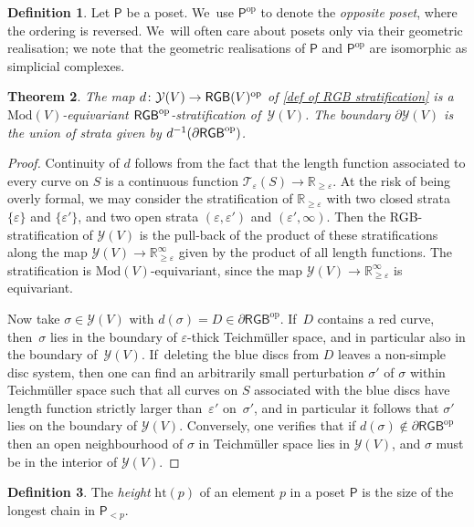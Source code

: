 \documentclass[JEP,XML,SOM,Unicode,NoFloatCountersInSection,published]{cedram}
\theoremstyle{plain}
\newtheorem{thm}{Theorem}[section]
\theoremstyle{definition}
\newtheorem{defn}[thm]{Definition}
\let\eps\varepsilon
\newcommand{\R}{\mathbb R}
\newcommand{\T}{\mathcal T}
\newcommand{\Y}{\mathcal Y}
\newcommand{\RGB}{{\mathsf{RGB}}}
\newcommand{\dRGB}{\partial\mathsf{RGB}}
\newcommand{\Po}{\mathsf{P}}
\newcommand{\hmod}{\mathrm{Mod}}
\newcommand{\op}{{\mathrm{op}}}
\newcommand{\Ht}{{\mathrm{ht}}}
\begin{document}
\begin{defn}Let $\Po$ be a poset. We~use $\Po^\op$ to denote the \emph{opposite poset}, where the ordering is reversed. We~will often care about posets only via their geometric realisation; we note that the geometric realisations of $\Po$ and $\Po^\op$ are isomorphic as simplicial complexes.
\end{defn}

\begin{thm}\label{thm:combinatorial model}
The map $d \colon \Y(V) \to \RGB(V)^\textnormal{op}$ of \cref{def of RGB stratification} is a $\hmod(V)$-equivariant $\RGB^\textnormal{op}$-stratification of $\,\Y(V)$. The boundary $\partial \Y(V)$ is the union of strata given by $d^{-1}(\dRGB^\textnormal{op})$.
\end{thm}

\begin{proof}Continuity of $d$ follows from the fact that the length function associated to every curve on $S$ is a continuous function $\T_\eps(S)\to \R_{\geq \eps}$. At the risk of being overly formal, we may consider the stratification of $\R_{\geq \eps}$ with two closed strata $\{\eps\}$ and $\{\eps'\}$, and two open strata $(\eps,\eps')$ and $(\eps',\infty)$. Then the RGB-stratification of $\Y(V)$ is the pull-back of the product of these stratifications along the map $\Y(V) \to \R_{\geq \eps}^\infty$ given by the product of all length functions. The stratification is $\hmod(V)$-equivariant, since the map $\Y(V) \to \R_{\geq \eps}^\infty$ is equivariant.

Now take $\sigma \in \Y(V)$ with $d(\sigma)=D\in \dRGB^\op$. If~$D$ contains a red curve, then~$\sigma$ lies in the boundary of $\eps$-thick Teichmüller space, and in particular also in the boundary of~$\Y(V)$. If~deleting the blue discs from $D$ leaves a non-simple disc system, then one can find an arbitrarily small perturbation $\sigma'$ of $\sigma$ within Teichmüller space such that all curves on $S$ associated with the blue discs have length function strictly larger than~$\eps'$ on~$\sigma'$, and in particular it follows that $\sigma'$ lies on the boundary of $\Y(V)$. Conversely, one verifies that if $d(\sigma) \notin \dRGB^\op$ then an open neighbourhood of $\sigma$ in Teichmüller space lies in $\Y(V)$, and $\sigma$ must be in the interior of $\Y(V)$.
\end{proof}

\begin{defn}\label{ht of element}
The \emph{height} $\Ht(p)$ of an element $p$ in a poset $\Po$ is the size of the longest chain in $\Po_{<p}$.
\end{defn}
\end{document}
